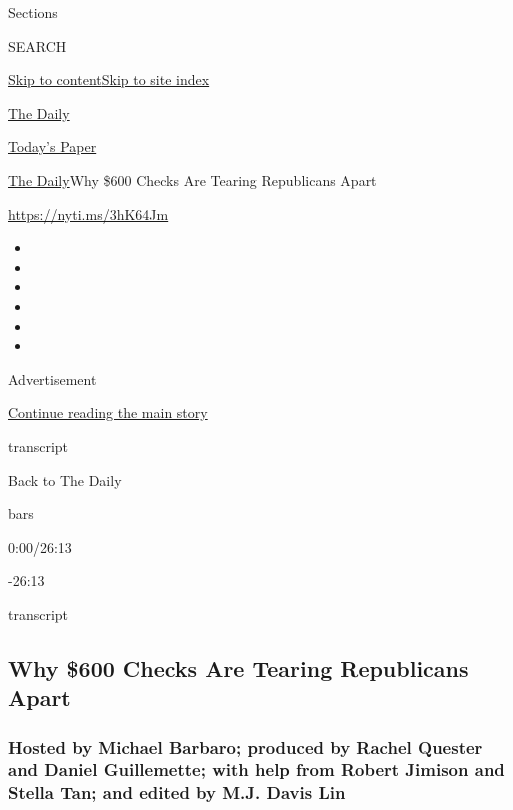 Sections

SEARCH

\protect\hyperlink{site-content}{Skip to
content}\protect\hyperlink{site-index}{Skip to site index}

\href{https://www.nytimes.com/podcasts/the-daily}{The Daily}

\href{https://myaccount.nytimes.com/auth/login?response_type=cookie\&client_id=vi}{}

\href{https://www.nytimes.com/section/todayspaper}{Today's Paper}

\href{/podcasts/the-daily}{The Daily}\textbar{}Why \$600 Checks Are
Tearing Republicans Apart

\url{https://nyti.ms/3hK64Jm}

\begin{itemize}
\item
\item
\item
\item
\item
\item
\end{itemize}

Advertisement

\protect\hyperlink{after-top}{Continue reading the main story}

transcript

Back to The Daily

bars

0:00/26:13

-26:13

transcript

\hypertarget{why-600-checks-are-tearing-republicans-apart}{%
\subsection{Why \$600 Checks Are Tearing Republicans
Apart}\label{why-600-checks-are-tearing-republicans-apart}}

\hypertarget{hosted-by-michael-barbaro-produced-by-rachel-quester-and-daniel-guillemette-with-help-from-robert-jimison-and-stella-tan-and-edited-by-mj-davis-lin}{%
\subsubsection{Hosted by Michael Barbaro; produced by Rachel Quester and
Daniel Guillemette; with help from Robert Jimison and Stella Tan; and
edited by M.J. Davis
Lin}\label{hosted-by-michael-barbaro-produced-by-rachel-quester-and-daniel-guillemette-with-help-from-robert-jimison-and-stella-tan-and-edited-by-mj-davis-lin}}


